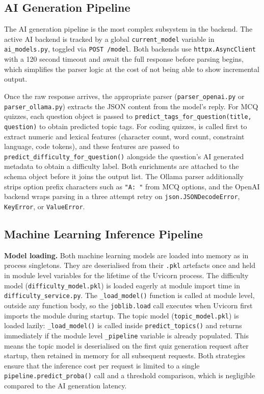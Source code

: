 \subsection{AI Generation Pipeline}

The AI generation pipeline is the most complex subsystem in the backend.
The active AI backend is tracked by a global \texttt{current\_model}
variable in \texttt{ai\_models.py}, toggled via \texttt{POST /model}.
Both backends use \texttt{httpx.AsyncClient} with a 120 second timeout
and await the full response before parsing begins, which simplifies the
parser logic at the cost of not being able to show incremental output.

Once the raw response arrives, the appropriate parser
(\texttt{parser\_openai.py} or \texttt{parser\_ollama.py}) extracts the
JSON content from the model's reply. For MCQ quizzes, each question
object is passed to \texttt{predict\_tags\_for\_question(title,
question)} to obtain predicted topic tags. For coding quizzes,
 is called first to extract numeric
and lexical features (character count, word count, constraint language,
code tokens), and these features are passed to
\texttt{predict\_difficulty\_for\_question()} alongside the question's
AI generated metadata to obtain a difficulty label. Both enrichments
are attached to the schema object before it joins the output list. The
Ollama parser additionally strips option prefix characters such as
\texttt{"A: "} from MCQ options, and the OpenAI backend wraps parsing
in a three attempt retry on \texttt{json.JSONDecodeError},
\texttt{KeyError}, or \texttt{ValueError}.

\subsection{Machine Learning Inference Pipeline}

\textbf{Model loading.} Both machine learning models are loaded into
memory as in process singletons. They are deserialised from their
\texttt{.pkl} artefacts once and held in module level variables for the
lifetime of the Uvicorn process. The difficulty model
(\texttt{difficulty\_model.pkl}) is loaded eagerly at module import
time in \texttt{difficulty\_service.py}. The \texttt{\_load\_model()}
function is called at module level, outside any function body, so the
\texttt{joblib.load} \cite{joblib2025} call executes when Uvicorn first
imports the module during startup. The topic model
(\texttt{topic\_model.pkl}) is loaded lazily: \texttt{\_load\_model()}
is called inside \texttt{predict\_topics()} and returns immediately if
the module level \texttt{\_pipeline} variable is already populated.
This means the topic model is deserialised on the first quiz generation
request after startup, then retained in memory for all subsequent
requests. Both strategies ensure that the inference cost per request is
limited to a single \texttt{pipeline.predict\_proba()} call and a
threshold comparison, which is negligible compared to the AI generation
latency.

